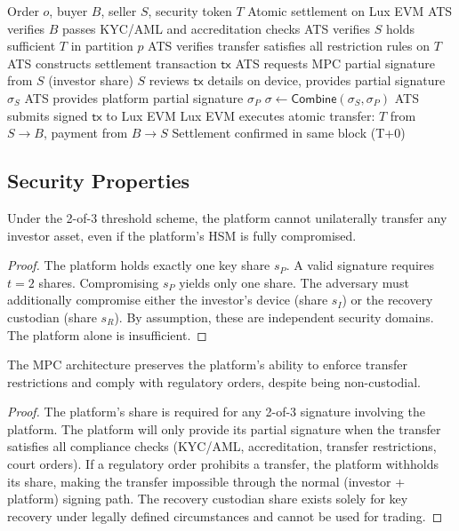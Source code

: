 \begin{algorithm}[H]
\caption{Non-custodial securities transfer.}
\label{alg:transfer}
\begin{algorithmic}[1]
\Require Order $o$, buyer $B$, seller $S$, security token $T$
\Ensure Atomic settlement on Lux EVM
\State ATS verifies $B$ passes KYC/AML and accreditation checks
\State ATS verifies $S$ holds sufficient $T$ in partition $p$
\State ATS verifies transfer satisfies all restriction rules on $T$
\State ATS constructs settlement transaction $\textsf{tx}$
\State ATS requests MPC partial signature from $S$ (investor share)
\State $S$ reviews $\textsf{tx}$ details on device, provides partial signature $\sigma_S$
\State ATS provides platform partial signature $\sigma_P$
\State $\sigma \gets \textsf{Combine}(\sigma_S, \sigma_P)$ 
\State ATS submits signed $\textsf{tx}$ to Lux EVM
\State Lux EVM executes atomic transfer: $T$ from $S \to B$, payment from $B \to S$
\State Settlement confirmed in same block (T+0)
\end{algorithmic}
\end{algorithm}

\subsection{Security Properties}

\begin{theorem}
Under the 2-of-3 threshold scheme, the platform cannot unilaterally transfer any investor asset, even if the platform's HSM is fully compromised.
\end{theorem}

\begin{proof}
The platform holds exactly one key share $s_P$. A valid signature requires $t = 2$ shares. Compromising $s_P$ yields only one share. The adversary must additionally compromise either the investor's device (share $s_I$) or the recovery custodian (share $s_R$). By assumption, these are independent security domains. The platform alone is insufficient.
\end{proof}

\begin{theorem}
The MPC architecture preserves the platform's ability to enforce transfer restrictions and comply with regulatory orders, despite being non-custodial.
\end{theorem}

\begin{proof}
The platform's share is required for any 2-of-3 signature involving the platform. The platform will only provide its partial signature when the transfer satisfies all compliance checks (KYC/AML, accreditation, transfer restrictions, court orders). If a regulatory order prohibits a transfer, the platform withholds its share, making the transfer impossible through the normal (investor + platform) signing path. The recovery custodian share exists solely for key recovery under legally defined circumstances and cannot be used for trading.
\end{proof}

